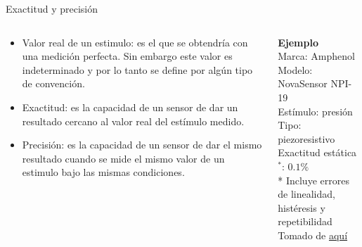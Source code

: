\documentclass[aspectratio=169]{beamer}
\begin{document}
\begin{frame}{Exactitud y precisión}
    \begin{columns}[c, onlytextwidth]
        \begin{column}{0.55\textwidth}
            \begin{itemize}
                \item Valor real de un estimulo: es el que se obtendría con una medición perfecta. Sin embargo este valor es indeterminado y por lo tanto se define por algún tipo de convención. 
                \item Exactitud: es la capacidad de un sensor de dar un resultado cercano al valor real del estímulo medido.
                \item Precisión: es la capacidad de un sensor de dar el mismo resultado cuando se mide el mismo valor de un estimulo bajo las mismas condiciones. 
            \end{itemize}
        \end{column}
        \begin{column}{0.40\textwidth}
            \textbf{Ejemplo}\\[4pt]
            Marca: Amphenol\\[4pt]
            Modelo: NovaSensor NPI-19\\[4pt]
            Estímulo: presión\\[4pt]
            Tipo: piezoresistivo\\[4pt]
            Exactitud estática$^*$: $0.1 \%$ \\[10pt]
            \tiny{* Incluye errores de linealidad, histéresis y repetibilidad}\\
            \tiny{Tomado de \href{https://f.hubspotusercontent40.net/hubfs/9035299/Documents/AAS-920-298B-NovaSensor\%20NPI-19-REVISED-061714-web.pdf}{aquí}}
        \end{column}
    \end{columns}
\end{frame}
\end{document}
